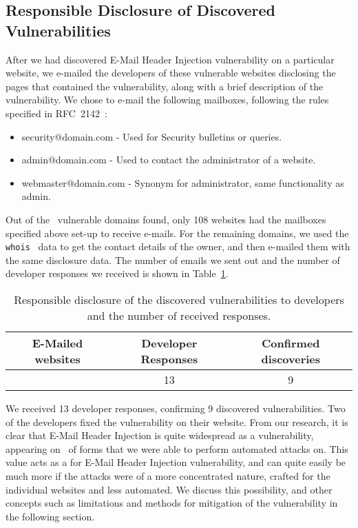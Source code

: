 \subsection{Responsible Disclosure of Discovered Vulnerabilities}
After we had discovered E-Mail Header Injection vulnerability on a particular website, we e-mailed the developers of these vulnerable websites disclosing the pages that contained the vulnerability, along with a brief description of the vulnerability.
We chose to e-mail the following mailboxes, following the rules specified in RFC~2142~\cite{rfc2142}:
\begin{itemize}
	\item security@domain.com - Used for Security bulletins or queries.
	\item admin@domain.com - Used to contact the administrator of a website.
	\item webmaster@domain.com - Synonym for administrator, same functionality as admin.
\end{itemize}

Out of the \domains\ vulnerable domains found, only 108 websites had the mailboxes specified above set-up to receive e-mails. For the remaining domains, we used the \texttt{whois}~\cite{whois} data to get the contact details of the owner, and then e-mailed them with the same disclosure data. The number of emails we sent out and the number of developer responses we received is shown in Table~\ref{tab:devresp}.

\begin{table}
\centering
\begin{tabular}{|c|c|c|}
	\hline
	\multicolumn{1}{|p{2cm}}{\centering \textbf{E-Mailed websites}} &
	\multicolumn{1}{|p{2cm}|}{\centering \textbf{Developer Responses}} &
	\multicolumn{1}{p{2cm}|}{\centering \textbf{Confirmed discoveries}}\\
	\hline
	\domains\ & 13 & 9 \\
	\hline
\end{tabular}
	\caption[]{Responsible disclosure of the discovered vulnerabilities to developers and the number of received responses.}
	\label{tab:devresp}
\end{table}

We received 13 developer responses, confirming 9 discovered vulnerabilities. Two of the developers fixed the vulnerability on their website.
From our research, it is clear that E-Mail Header Injection is quite widespread as a vulnerability, appearing on \successDelta\ of forms that we were able to perform automated attacks on. This value acts as a  for E-Mail Header Injection vulnerability, and can quite easily be much more if the attacks were of a more concentrated nature, crafted for the individual websites and less automated. We discuss this possibility, and other concepts such as limitations and methods for mitigation of the vulnerability in the following section.